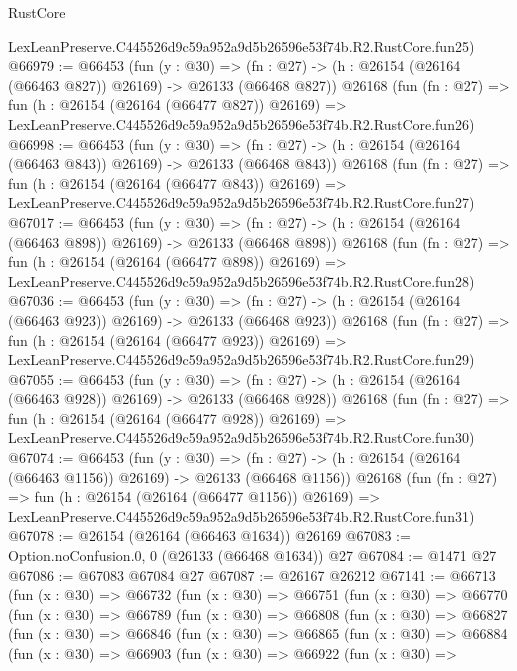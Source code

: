 \begin{lexlean}{RustCore}
\begin{coremodule}
    LexLeanPreserve.C445526d9c59a952a9d5b26596e53f74b.R2.RustCore.fun25)
@66979 := @66453
    (fun (y : @30) =>
    (fn : @27) -> (h : @26154 (@26164 (@66463 @827)) @26169) -> @26133 (@66468 @827))
    @26168
    (fun (fn : @27) =>
    fun (h : @26154 (@26164 (@66477 @827)) @26169) =>
    LexLeanPreserve.C445526d9c59a952a9d5b26596e53f74b.R2.RustCore.fun26)
@66998 := @66453
    (fun (y : @30) =>
    (fn : @27) -> (h : @26154 (@26164 (@66463 @843)) @26169) -> @26133 (@66468 @843))
    @26168
    (fun (fn : @27) =>
    fun (h : @26154 (@26164 (@66477 @843)) @26169) =>
    LexLeanPreserve.C445526d9c59a952a9d5b26596e53f74b.R2.RustCore.fun27)
@67017 := @66453
    (fun (y : @30) =>
    (fn : @27) -> (h : @26154 (@26164 (@66463 @898)) @26169) -> @26133 (@66468 @898))
    @26168
    (fun (fn : @27) =>
    fun (h : @26154 (@26164 (@66477 @898)) @26169) =>
    LexLeanPreserve.C445526d9c59a952a9d5b26596e53f74b.R2.RustCore.fun28)
@67036 := @66453
    (fun (y : @30) =>
    (fn : @27) -> (h : @26154 (@26164 (@66463 @923)) @26169) -> @26133 (@66468 @923))
    @26168
    (fun (fn : @27) =>
    fun (h : @26154 (@26164 (@66477 @923)) @26169) =>
    LexLeanPreserve.C445526d9c59a952a9d5b26596e53f74b.R2.RustCore.fun29)
@67055 := @66453
    (fun (y : @30) =>
    (fn : @27) -> (h : @26154 (@26164 (@66463 @928)) @26169) -> @26133 (@66468 @928))
    @26168
    (fun (fn : @27) =>
    fun (h : @26154 (@26164 (@66477 @928)) @26169) =>
    LexLeanPreserve.C445526d9c59a952a9d5b26596e53f74b.R2.RustCore.fun30)
@67074 := @66453
    (fun (y : @30) =>
    (fn : @27) -> (h : @26154 (@26164 (@66463 @1156)) @26169) -> @26133 (@66468 @1156))
    @26168
    (fun (fn : @27) =>
    fun (h : @26154 (@26164 (@66477 @1156)) @26169) =>
    LexLeanPreserve.C445526d9c59a952a9d5b26596e53f74b.R2.RustCore.fun31)
@67078 := @26154 (@26164 (@66463 @1634)) @26169
@67083 := Option.noConfusion.{0, 0} (@26133 (@66468 @1634)) @27
@67084 := @1471 @27
@67086 := @67083 @67084 @27
@67087 := @26167 @26212
@67141 := @66713
    (fun (x : @30) =>
    @66732
      (fun (x : @30) =>
      @66751
        (fun (x : @30) =>
        @66770
          (fun (x : @30) =>
          @66789
            (fun (x : @30) =>
            @66808
              (fun (x : @30) =>
              @66827
                (fun (x : @30) =>
                @66846
                  (fun (x : @30) =>
                  @66865
                    (fun (x : @30) =>
                    @66884
                      (fun (x : @30) =>
                      @66903
                        (fun (x : @30) =>
                        @66922
                          (fun (x : @30) =>

\end{coremodule}
\end{lexlean}
